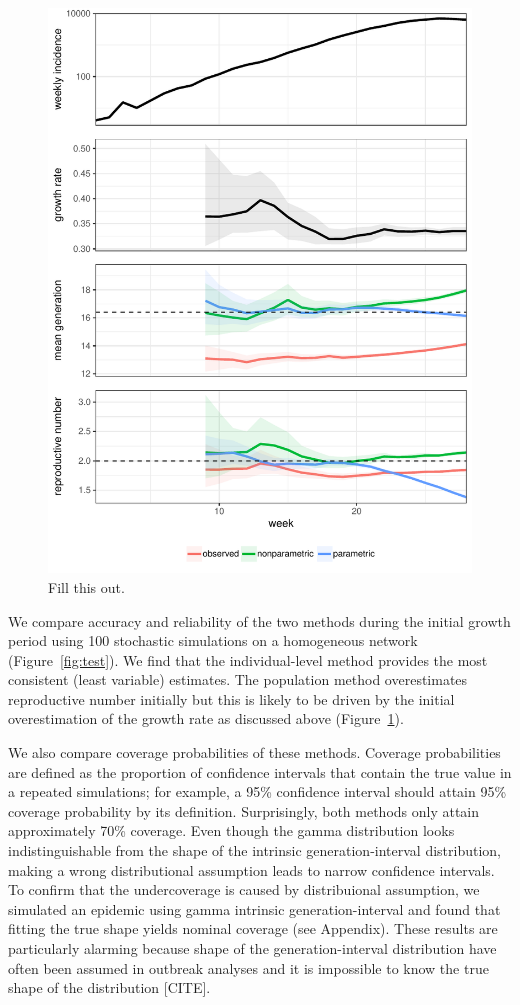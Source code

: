\documentclass[12pt]{article}
\begin{document}
\begin{figure}
\includegraphics[width=\textwidth]{../fig/example.pdf}
\caption{Fill this out.}
\label{fig:example}
\end{figure}

We compare accuracy and reliability of the two methods during the initial growth period using 100 stochastic simulations on a homogeneous network (Figure~\ref{fig:test}).
We find that the individual-level method provides the most consistent (least variable) estimates.
The population method overestimates reproductive number initially but this is likely to be driven by the initial overestimation of the growth rate as discussed above (Figure~\ref{fig:example}).

We also compare coverage probabilities of these methods. 
Coverage probabilities are defined as the proportion of confidence intervals that contain the true value in a repeated simulations; for example, a 95\% confidence interval should attain 95\% coverage probability by its definition.
Surprisingly, both methods only attain approximately 70\% coverage.
Even though the gamma distribution looks indistinguishable from the shape of the intrinsic generation-interval distribution, making a wrong distributional assumption leads to narrow confidence intervals.
To confirm that the undercoverage is caused by distribuional assumption, we simulated an epidemic using gamma intrinsic generation-interval and found that fitting the true shape yields nominal coverage (see Appendix).
These results are particularly alarming because shape of the generation-interval distribution have often been assumed in outbreak analyses and it is impossible to know the true shape of the distribution [CITE].
\end{document}
